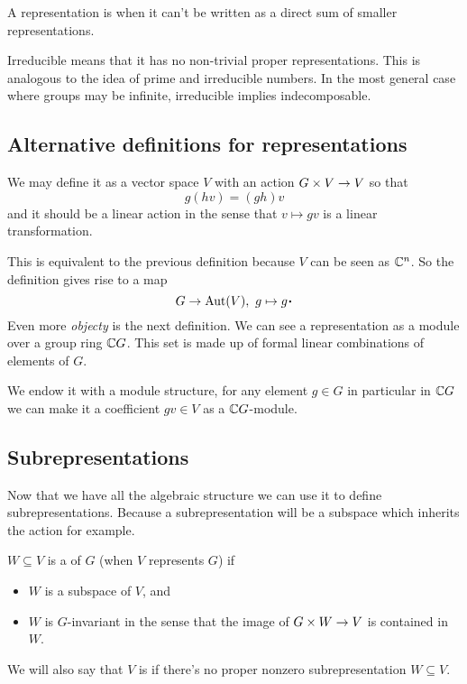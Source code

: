 \documentclass[12pt]{memoir}
\begin{document}
\begin{Def}
A representation is  when it can't be written as a direct sum of smaller representations.
\end{Def}

Irreducible means that it has no non-trivial proper representations. This is analogous to the idea of prime and irreducible numbers. In the most general case where groups may be infinite, irreducible implies indecomposable. 

\subsection{Alternative definitions for representations}

We may define it as a vector space $V$ with an action $G\times V\to V$ so that
$$g(hv)=(gh)v$$
and it should be a linear action in the sense that $v\mapsto gv$ is a linear transformation.\par 

This is equivalent to the previous definition because $V$ can be seen as $\mathbb{C}^n$. So the definition gives rise to a map 
$$G\to\Aut(V),\ g\mapsto g\.$$
Even more \emph{objecty} is the next definition. We can see a representation as a module over a group ring $\mathbb{C} G$. This set is made up of formal linear combinations of elements of $G$.\par 
We endow it with a module structure, for any element $g\in G$ in particular in $\mathbb{C} G$ we can make it a coefficient $gv\in V$ as a $\mathbb{C} G$-module.

\subsection{Subrepresentations}

Now that we have all the algebraic structure we can use it to define subrepresentations. Because a subrepresentation will be a subspace which inherits the action for example. 

\begin{Def}
    $W\subseteq V$ is a  of $G$ (when $V$ represents $G$) if 
    \begin{itemize}
        \item $W$ is a subspace of $V$, and
        \item $W$ is $G$-invariant in the sense that the image of $G\times W\to V$ is contained in $W$.
    \end{itemize}
    We will also say that $V$ is  if there's no proper nonzero subrepresentation $W\subseteq V$.
\end{Def}
\end{document}
